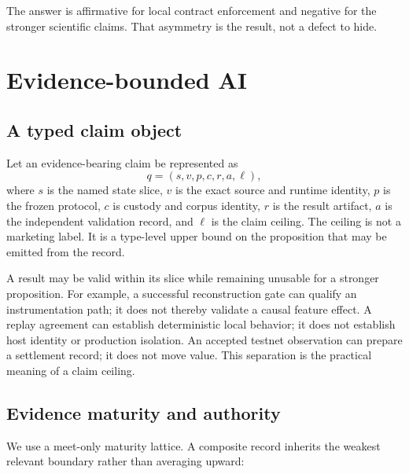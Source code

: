\documentclass[11pt,twoside]{article}
\begin{document}
  The answer is affirmative for local contract enforcement and negative for the stronger scientific claims. That asymmetry is the result, not a defect to hide.

\section{Evidence-bounded AI}

\subsection{A typed claim object}

  Let an evidence-bearing claim be represented as
\[
  q = (s, v, p, c, r, a, \ell),
\]
where $s$ is the named state slice, $v$ is the exact source and runtime identity, $p$ is the frozen protocol, $c$ is custody and corpus identity, $r$ is the result artifact, $a$ is the independent validation record, and $\ell$ is the claim ceiling. The ceiling is not a marketing label. It is a type-level upper bound on the proposition that may be emitted from the record.

  A result may be valid within its slice while remaining unusable for a stronger proposition. For example, a successful reconstruction gate can qualify an instrumentation path; it does not thereby validate a causal feature effect. A replay agreement can establish deterministic local behavior; it does not establish host identity or production isolation. An accepted testnet observation can prepare a settlement record; it does not move value. This separation is the practical meaning of a claim ceiling.

\subsection{Evidence maturity and authority}

  We use a meet-only maturity lattice. A composite record inherits the weakest relevant boundary rather than averaging upward:
\end{document}
